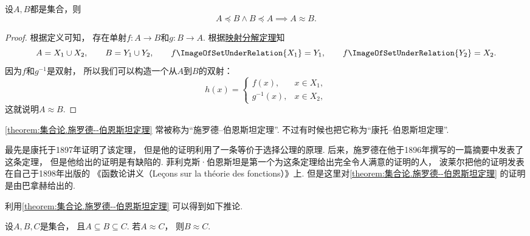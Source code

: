 \begin{theorem}\label{theorem:集合论.施罗德--伯恩斯坦定理}
设\(A,B\)都是集合，则\begin{equation*}
	A \preceq B \land B \preceq A \implies A \approx B.
\end{equation*}
\begin{proof}
根据定义可知，
存在单射\(f\colon A \to B\)和\(g\colon B \to A\).
根据\hyperref[theorem:基数.集合在映射下的分解]{映射分解定理}知\begin{equation*}
	A = X_1 \cup X_2, \qquad
	B = Y_1 \cup Y_2, \qquad
	f\ImageOfSetUnderRelation{X_1} = Y_1, \qquad
	f\ImageOfSetUnderRelation{Y_2} = X_2.
\end{equation*}
因为\(f\)和\(g^{-1}\)是双射，
所以我们可以构造一个从\(A\)到\(B\)的双射：\begin{equation*}
	h(x) = \left\{ \begin{array}{cl}
		f(x), & x \in X_1, \\
		g^{-1}(x), & x \in X_2,
	\end{array} \right.
\end{equation*}
这就说明\(A \approx B\).
\end{proof}
\end{theorem}
\cref{theorem:集合论.施罗德--伯恩斯坦定理}
常被称为“施罗德--伯恩斯坦定理”.
不过有时候也把它称为“康托--伯恩斯坦定理”.

最先是康托于1897年证明了该定理，
但是他的证明利用了一条等价于选择公理的原理.
后来，施罗德在他于1896年撰写的一篇摘要中发表了这条定理，
但是他给出的证明是有缺陷的.
菲利克斯·伯恩斯坦是第一个为这条定理给出完全令人满意的证明的人，
波莱尔把他的证明发表在自己于1898年出版的
《函数论讲义（Le\c{c}ons sur la th\'eorie des fonctions）》上.
但是这里对\cref{theorem:集合论.施罗德--伯恩斯坦定理} 的证明是由巴拿赫给出的.

利用\cref{theorem:集合论.施罗德--伯恩斯坦定理} 可以得到如下推论.
\begin{corollary}\label{theorem:集合论.施罗德--伯恩斯坦定理.推论1}
设\(A,B,C\)是集合，
且\(A \subseteq B \subseteq C\).
若\(A \approx C\)，
则\(B \approx C\).
\end{corollary}

